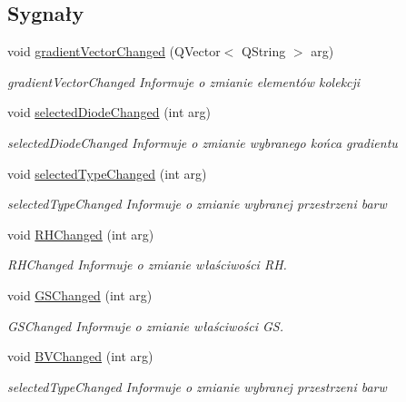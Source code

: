 \subsection*{Sygnały}
\begin{DoxyCompactItemize}
\item 
void \mbox{\hyperlink{class_gradient_view_model_a5f33840baf0a02fab681992c3a9fbb29}{gradient\+Vector\+Changed}} (Q\+Vector$<$ Q\+String $>$ arg)
\begin{DoxyCompactList}\small\item\em gradient\+Vector\+Changed Informuje o zmianie elementów kolekcji \end{DoxyCompactList}\item 
void \mbox{\hyperlink{class_gradient_view_model_ad26d1979a011e1810e3e2e6c648b3882}{selected\+Diode\+Changed}} (int arg)
\begin{DoxyCompactList}\small\item\em selected\+Diode\+Changed Informuje o zmianie wybranego końca gradientu \end{DoxyCompactList}\item 
void \mbox{\hyperlink{class_gradient_view_model_a5dbe7b881e5b4ef1ddbed14f0015a355}{selected\+Type\+Changed}} (int arg)
\begin{DoxyCompactList}\small\item\em selected\+Type\+Changed Informuje o zmianie wybranej przestrzeni barw \end{DoxyCompactList}\item 
void \mbox{\hyperlink{class_gradient_view_model_a50c4f64eb680f0efdb80b1e6888fc51c}{R\+H\+Changed}} (int arg)
\begin{DoxyCompactList}\small\item\em R\+H\+Changed Informuje o zmianie właściwości RH. \end{DoxyCompactList}\item 
void \mbox{\hyperlink{class_gradient_view_model_a09e3fbfaa0b3f501ae7637736b5dcdc5}{G\+S\+Changed}} (int arg)
\begin{DoxyCompactList}\small\item\em G\+S\+Changed Informuje o zmianie właściwości GS. \end{DoxyCompactList}\item 
void \mbox{\hyperlink{class_gradient_view_model_affb6254ecc82d22552db80ecb959a9a0}{B\+V\+Changed}} (int arg)
\begin{DoxyCompactList}\small\item\em selected\+Type\+Changed Informuje o zmianie wybranej przestrzeni barw \end{DoxyCompactList}\end{DoxyCompactItemize}
